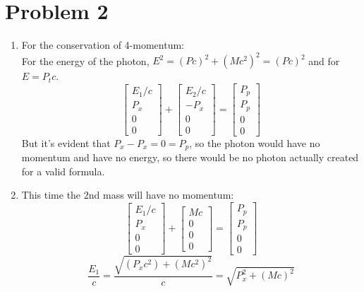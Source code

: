 \documentclass[11pt]{article}
\begin{document}
\section*{Problem 2}
    \begin{enumerate}[label=\alph*)]
        \item 
        For the conservation of 4-momentum: \\
        For the energy of the photon, $E^2 = (Pc)^2 + (Mc^2)^2 = (Pc)^2$ and for $E = P_tc$.
        \[\begin{bmatrix}
        E_1/c \\ P_x \\ 0 \\ 0
        \end{bmatrix}
        +
        \begin{bmatrix}
        E_2/c \\ -P_x \\ 0 \\ 0
        \end{bmatrix}
        =
        \begin{bmatrix}
        P_p \\ P_p \\ 0 \\ 0
        \end{bmatrix}\]
        But it's evident that $P_x-P_x = 0 = P_p$, so the photon would have no momentum and have no energy, so there would be no photon actually created for a valid formula. 
        \item
        This time the 2nd mass will have no momentum:\\
        \[\begin{bmatrix}
        E_1/c \\ P_x \\ 0 \\ 0
        \end{bmatrix}
        +
        \begin{bmatrix}
        Mc \\ 0 \\ 0 \\ 0
        \end{bmatrix}
        =
        \begin{bmatrix}
        P_p \\ P_p \\ 0 \\ 0
        \end{bmatrix}\]
        \[\frac{E_1}{c}= \frac{\sqrt{(P_xc^2)+ (Mc^2)^2}}{c} = \sqrt{P_x^2 + (Mc)^2}\]

\end{enumerate}
\end{document}
